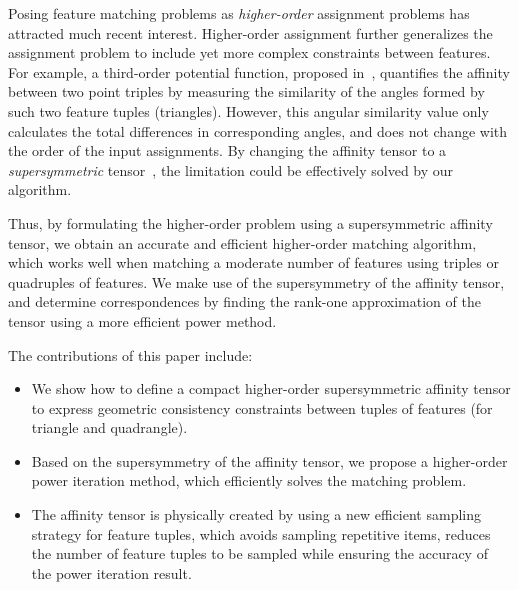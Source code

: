 Posing feature matching problems as \emph{higher-order} assignment problems has attracted much recent interest.
Higher-order assignment further generalizes the assignment problem to include yet more complex constraints between features.
For example, a third-order potential function, proposed in~\cite{Duchenne_etal09,Chertok10}, 
quantifies the affinity between two point triples
by measuring the similarity of the angles formed by such two feature tuples (triangles).
However, this angular similarity value only calculates the total differences in corresponding angles, 
and does not change with the order of the input assignments.
By changing the affinity tensor to a \emph{supersymmetric} tensor~\cite{Kofidis02}, the limitation could be effectively solved by our algorithm.

Thus, by formulating the higher-order problem using a supersymmetric affinity tensor,
we obtain an accurate and efficient higher-order matching algorithm,
which works well when matching a moderate number of features using triples or quadruples of features.
We make use of the supersymmetry of the affinity tensor,
and determine correspondences by finding the rank-one approximation of the tensor using a more efficient power method.

The contributions of this paper include:
\begin{itemize}
\item We show how to define a compact higher-order supersymmetric affinity tensor to express geometric consistency constraints between tuples of features (for triangle and quadrangle).

\item Based on the supersymmetry of the affinity tensor, we propose a higher-order power iteration method, which efficiently solves the matching problem.

\item The affinity tensor is physically created by using a new efficient sampling strategy for feature tuples, 
which avoids sampling repetitive items, reduces the number of feature tuples to be sampled while ensuring the accuracy of the power iteration result.


\end{itemize}

